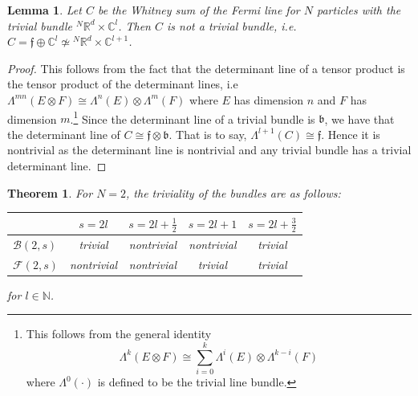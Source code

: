 \documentclass[11pt]{article}
\newtheorem{theorem}{Theorem}
\newtheorem{lemma}{Lemma}
\theoremstyle{remark}
\begin{document}
\begin{lemma}
Let $C$ be the Whitney sum of the Fermi line for $N$ particles with
the  trivial
bundle $\ensuremath{{}^N\ensuremath{\mathbb{R}^{\ensuremath{d}}}} \times \ensuremath{\mathbb{C}}^l$. 
Then  $C$ is not a trivial bundle, i.e. 
$ C  = \ensuremath{\mathfrak{f}} \oplus \ensuremath{\mathbb{C}}^l \ensuremath{\not\simeq} \ensuremath{{}^N\ensuremath{\mathbb{R}^{\ensuremath{d}}}} \times
\ensuremath{\mathbb{C}}^{l+1}$.
\end{lemma} 

\begin{proof}
This follows from the fact that the determinant line of a tensor
product is the tensor product of the determinant lines, i.e 
$\Lambda^{mn}(E \otimes F) \ensuremath{\cong} \Lambda^{n}(E)\otimes
\Lambda^{m}(F)$ where $E$ has dimension $n$ and $F$ has dimension
$m$.\footnote{This follows from the general identity 
\[ 
\Lambda^k(E\otimes F) \ensuremath{\cong} \sum_{i=0}^k \Lambda^i(E) \otimes
\Lambda^{k-i}(F)
\]    
where $\Lambda^0(\cdot)$ is defined to be the trivial line bundle.} 
Since the determinant line of a trivial bundle is \ensuremath{\mathfrak{b}}, we have that
the determinant line of $C \ensuremath{\cong} \ensuremath{\mathfrak{f}} \otimes \ensuremath{\mathfrak{b}}$. 
That is to say, $\Lambda^{l+1}(C) \ensuremath{\cong}
\ensuremath{\mathfrak{f}}$. Hence it is nontrivial as the determinant line is
nontrivial and any trivial bundle has a trivial determinant line.  
\end{proof}

\begin{theorem}
For $N =2$,  the triviality of the bundles are as follows:  

\begin{tabular}{|l|c|c|c|c|}
\hline
& $s=2l$  &  $s=2l+\frac{1}{2}$ &  $s=2l+1$ &  $s=2l+\frac{3}{2}$\\
\hline
$\ensuremath{\mathcal{B}(2,s)}$ & trivial & nontrivial & nontrivial & trivial \\
$\ensuremath{\ensuremath{\mathcal{F}}(2,s)} $ & nontrivial & nontrivial & trivial & trivial\\
\hline
\end{tabular}
for $l \in \mathbb{N}$. 
\end{theorem}
\end{document}
